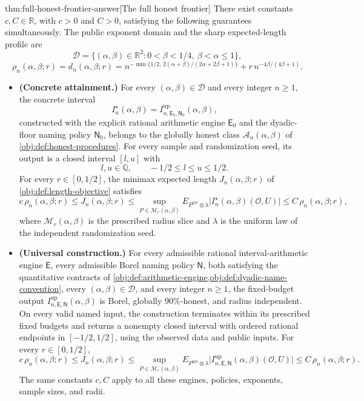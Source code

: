 \begin{theoremv}{thm:full-honest-frontier-answer}[The full honest frontier]
There exist constants \(c,C\in\mathbb R\), with \(c>0\) and \(C>0\), satisfying the following guarantees simultaneously. The public exponent domain and the sharp expected-length profile are
\[
\mathcal D=\{(\alpha,\beta)\in\mathbb R^2:0<\beta<1/4,\ \beta<\alpha\le1\},
\]
\[
\rho_n(\alpha,\beta;r)=d_n(\alpha,\beta;r)
=n^{-\min\{1/2,\,2(\alpha+\beta)/(2\alpha+2\beta+1)\}}
+r\,n^{-4\beta/(4\beta+1)}.
\]

\begin{itemize}
\item \textbf{(Concrete attainment.)}
For every \((\alpha,\beta)\in\mathcal D\) and every integer \(n\ge1\), the concrete interval
\[
I_n^\star(\alpha,\beta)
=I^{\mathrm{up}}_{n,\mathsf E_0,\mathsf N_0}(\alpha,\beta),
\]
constructed with the explicit rational arithmetic engine \(\mathsf E_0\) and the dyadic-floor naming policy \(\mathsf N_0\), belongs to the globally honest class \(\mathcal A_n(\alpha,\beta)\) of \cref{obj:def:honest-procedures}. For every sample and randomization seed, its output is a closed interval \([l,u]\) with
\[
l,u\in\mathbb Q,\qquad -1/2\le l\le u\le1/2.
\]
For every \(r\in[0,1/2]\), the minimax expected length \(J_n(\alpha,\beta;r)\) of \cref{obj:def:length-objective} satisfies
\[
c\,\rho_n(\alpha,\beta;r)
\le J_n(\alpha,\beta;r)
\le
\sup_{P\in\mathcal M_r(\alpha,\beta)}
E_{P^{\otimes n}\otimes\lambda}
\bigl|I_n^\star(\alpha,\beta)(\mathcal O,U)\bigr|
\le C\,\rho_n(\alpha,\beta;r),
\]
where \(\mathcal M_r(\alpha,\beta)\) is the prescribed radius slice and \(\lambda\) is the uniform law of the independent randomization seed.

\item \textbf{(Universal construction.)}
For every admissible rational interval-arithmetic engine \(\mathsf E\), every admissible Borel naming policy \(\mathsf N\), both satisfying the quantitative contracts of \cref{obj:def:arithmetic-engine,obj:def:dyadic-name-convention}, every \((\alpha,\beta)\in\mathcal D\), and every integer \(n\ge1\), the fixed-budget output
\(I^{\mathrm{up}}_{n,\mathsf E,\mathsf N}(\alpha,\beta)\)
is Borel, globally \(90\%\)-honest, and radius independent. On every valid named input, the construction terminates within its prescribed fixed budgets and returns a nonempty closed interval with ordered rational endpoints in \([-1/2,1/2]\), using the observed data and public inputs. For every \(r\in[0,1/2]\),
\[
c\,\rho_n(\alpha,\beta;r)
\le J_n(\alpha,\beta;r)
\le
\sup_{P\in\mathcal M_r(\alpha,\beta)}
E_{P^{\otimes n}\otimes\lambda}
\bigl|I^{\mathrm{up}}_{n,\mathsf E,\mathsf N}(\alpha,\beta)(\mathcal O,U)\bigr|
\le C\,\rho_n(\alpha,\beta;r).
\]
The same constants \(c,C\) apply to all these engines, policies, exponents, sample sizes, and radii.


\end{itemize}
\end{theoremv}
